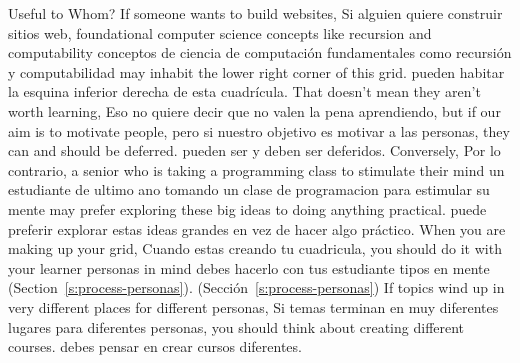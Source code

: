 \newpage
\begin{aside}{Useful to Whom?}
  If someone wants to build websites,
  Si alguien quiere construir sitios web,
  foundational computer science concepts like recursion and computability
  conceptos de ciencia de computación fundamentales como recursión y computabilidad
  may inhabit the lower right corner of this grid.
  pueden habitar la esquina inferior derecha de esta cuadrícula. 
  That doesn't mean they aren't worth learning,
  Eso no quiere decir que no valen la pena aprendiendo,
  but if our aim is to motivate people,
  pero si nuestro objetivo es motivar a las personas,
  they can and should be deferred.
  pueden ser y deben ser deferidos.
  Conversely,
  Por lo contrario,
  a senior who is taking a programming class to stimulate their mind
  un estudiante de ultimo ano tomando un clase de programacion para estimular su mente
  may prefer exploring these big ideas to doing anything practical.
  puede preferir explorar estas ideas grandes en vez de hacer algo práctico.
  When you are making up your grid,
  Cuando estas creando tu cuadricula,
  you should do it with your learner personas in mind
  debes hacerlo con tus estudiante tipos en mente
  (Section~\ref{s:process-personas}).
  (Sección~\ref{s:process-personas})
  If topics wind up in very different places for different personas,
  Si temas terminan en muy diferentes lugares para diferentes personas,
  you should think about creating different courses.
  debes pensar en crear cursos diferentes.
\end{aside}

